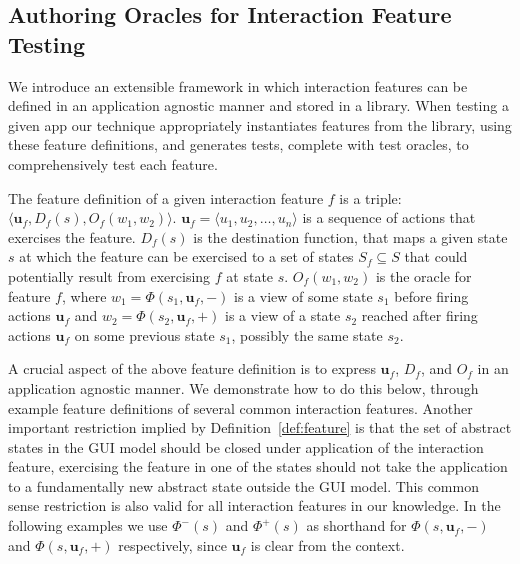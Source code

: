 \subsection{Authoring Oracles for Interaction Feature Testing}
\label{sec:featureDefinition}

We introduce an extensible framework in which interaction features can be defined in an application agnostic manner and stored in a library. When testing a given app our technique appropriately instantiates features from the library, using these feature definitions, and generates tests, complete with test oracles, to comprehensively test each feature.

\begin{mydef}
\label{def:feature}
The feature definition of a given interaction feature $f$ is a triple: $\langle \mathbf{u}_f, D_f(s), O_f(w_1, w_2) \rangle$. %
$\mathbf{u}_f = \langle u_1, u_2, \dots, u_n \rangle$ is a sequence of actions that exercises the feature. $D_f(s)$ is the destination function, that maps a given state $s$ at which the feature can be exercised to a set of states $S_f \subseteq S$ that could potentially result from exercising $f$ at state $s$. $O_f(w_1, w_2)$ is the oracle for feature $f$, where $w_1 = \Phi(s_1, \mathbf{u}_f, -)$ is a view of some state $s_1$
before firing actions $\mathbf{u}_f$ and $w_2=\Phi(s_2, \mathbf{u}_f, +)$ is a view of a state $s_2$ reached after firing actions $\mathbf{u}_f$ on some previous state $s_1$, possibly the same state $s_2$.
\end{mydef}
\vspace*{-2ex}

A crucial aspect of the above feature definition is to express $\mathbf{u}_f$, $D_f$, and $O_f$ in an application agnostic manner. We demonstrate how to do this below, through example feature definitions of several common interaction features. Another important restriction implied by Definition~\ref{def:feature} is that the set of abstract states in the GUI model should be closed under application of the interaction feature, \ie exercising the feature in one of the states should not take the application to a fundamentally new abstract state outside the GUI model. This common sense restriction is also valid for all interaction features in our knowledge. In the following examples we use $\Phi^-(s)$ and $\Phi^+(s)$ as shorthand for $\Phi(s, \mathbf{u}_f, -)$ and $\Phi(s, \mathbf{u}_f, +)$ respectively, since $\mathbf{u}_f$ is clear from the context.

